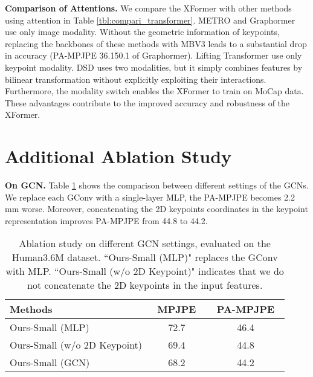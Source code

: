 \documentclass{article}
\newcommand\mypara[1]{\noindent\textbf{#1}}
\begin{document}
\mypara{Comparison of Attentions.} 
We compare the XFormer with other methods using attention in Table \ref{tbl:compari_transformer}. 
METRO and Graphormer use only image modality. Without the geometric information of keypoints, replacing the backbones of these methods with MBV3 leads to a substantial drop in accuracy (PA-MPJPE 36.150.1 of Graphormer).
Lifting Transformer \cite{li2021lifting} use only keypoint modality. 
DSD \cite{sun2019human} uses two modalities, but it simply combines features by bilinear transformation without explicitly exploiting their interactions. 
Furthermore, the modality switch enables the XFormer to train on MoCap data.
These advantages contribute to the improved accuracy and robustness of the XFormer.



\section{Additional Ablation Study}

\mypara{On GCN.} 
Table \ref{tbl:supp_ablation_gcn} shows the comparison between different settings of the GCNs. 
We replace each GConv with a single-layer MLP, the PA-MPJPE becomes 2.2 mm worse. 
Moreover, concatenating the 2D keypoints coordinates in the keypoint representation  improves PA-MPJPE from 44.8 to 44.2. 

\begin{table}[h]
\small
\renewcommand{\tabcolsep}{5pt}
\centering
{
\begin{tabular}{lcc}
\toprule
Methods         & ~MPJPE~ &  ~PA-MPJPE~ \\ 
\midrule
Ours-Small (MLP)       &   72.7    & 46.4    \\
Ours-Small (w/o 2D Keypoint)    &   69.4      & 44.8     \\  
Ours-Small (GCN) &   68.2    & 44.2   \\
\bottomrule
\end{tabular}
}
\caption{Ablation study on different GCN settings, evaluated on the Human3.6M dataset. ``Ours-Small (MLP)" replaces the GConv with MLP.
``Ours-Small (w/o 2D Keypoint)" indicates that we do not concatenate the 2D keypoints in the input features. 
}
\label{tbl:supp_ablation_gcn}
\end{table}
\end{document}
